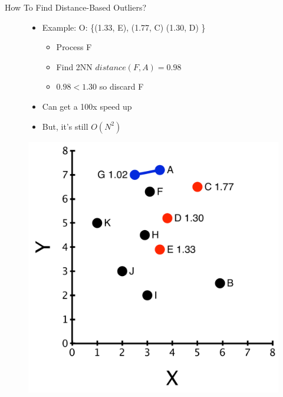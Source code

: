 \documentclass[aspectratio=169]{beamer}
\begin{document}
\begin{frame}{How To Find Distance-Based Outliers?}

\begin{figure}[ht]
\begin{minipage}[c]{0.4\linewidth}
\begin{itemize}
\item Example:  O: \{(1.33, E), (1.77, C) (1.30, D) \}
	\begin{itemize}
	\item Process F
	\item Find 2NN $distance(F,A) = 0.98$
	\item $0.98 < 1.30$ so discard F
	\end{itemize}
\item Can get a 100x speed up
\item But, it's still $O(N^2)$
\end{itemize}
\end{minipage}
\hspace{0.5cm}
\begin{minipage}[c]{0.5\linewidth}
\includegraphics[width=\textwidth]{lectOutliers/outliersPtsLabeledBetterAlg.pdf}
\end{minipage}
\end{figure}





\end{frame}
\end{document}
